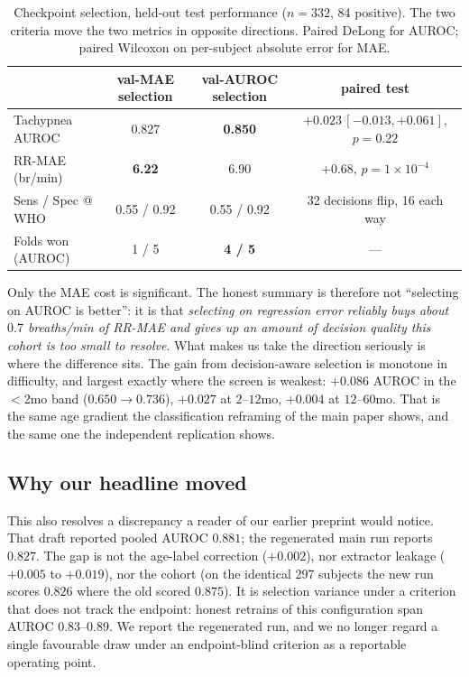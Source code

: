 \begin{table}[!t]
\caption{Checkpoint selection, held-out test performance ($n{=}332$, 84 positive). The two criteria move
the two metrics in opposite directions. Paired DeLong for AUROC; paired Wilcoxon on per-subject absolute
error for MAE.}
\label{tab:selection}\centering\small
\begin{tabular}{@{}lccc@{}}\toprule
 & val-MAE selection & val-AUROC selection & paired test\\\midrule
Tachypnea AUROC   & 0.827 & \textbf{0.850} & ${+}0.023\,[{-}0.013,{+}0.061]$, $p=0.22$\\
RR-MAE (br/min)   & \textbf{6.22} & 6.90 & ${+}0.68$, $p=1{\times}10^{-4}$\\
Sens / Spec @ WHO & 0.55 / 0.92 & 0.55 / 0.92 & 32 decisions flip, 16 each way\\
Folds won (AUROC) & 1 / 5 & \textbf{4 / 5} & ---\\\bottomrule
\end{tabular}
\end{table}

Only the MAE cost is significant. The honest summary is therefore not ``selecting on AUROC is better'':
it is that \emph{selecting on regression error reliably buys about $0.7$ breaths/min of RR-MAE and gives
up an amount of decision quality this cohort is too small to resolve}. What makes us take the direction
seriously is where the difference sits. The gain from decision-aware selection is monotone in difficulty,
and largest exactly where the screen is weakest: ${+}0.086$ AUROC in the $<$2mo band ($0.650\to0.736$),
${+}0.027$ at $2$--$12$mo, ${+}0.004$ at $12$--$60$mo. That is the same age gradient the classification
reframing of the main paper shows, and the same one the independent replication shows.

\subsection{Why our headline moved}
This also resolves a discrepancy a reader of our earlier preprint would notice. That draft reported
pooled AUROC $0.881$; the regenerated main run reports $0.827$. The gap is not the age-label correction
($+0.002$), nor extractor leakage ($+0.005$ to $+0.019$), nor the cohort (on the identical 297 subjects
the new run scores $0.826$ where the old scored $0.875$). It is selection variance under a criterion that
does not track the endpoint: honest retrains of this configuration span AUROC $0.83$--$0.89$. We report
the regenerated run, and we no longer regard a single favourable draw under an endpoint-blind criterion
as a reportable operating point.

